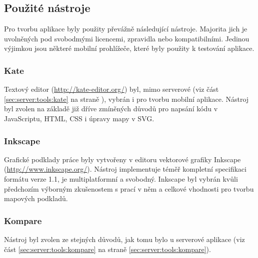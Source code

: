 \subsection{Použité nástroje}
Pro tvorbu aplikace byly použity převážně následující nástroje. Majorita jich je uvolněných pod svobodmými licencemi, zpravidla   nebo kompatibilními. Jedinou výjimkou jsou některé mobilní prohlížeče, které byly použity k testování aplikace.

\subsubsection{Kate}
Textový editor  (\url{http://kate-editor.org/}) byl, mimo serverové (viz část \ref{sec:server:tools:kate} na straně \pageref{sec:server:tools:kate}), vybrán i pro tvorbu mobilní aplikace. Nástroj byl zvolen na základě již dříve zmíněných důvodů pro napsání kódu v JavaScriptu, \gls{HTML}, \gls{CSS} i úpravy mapy v \gls{SVG}.

\subsubsection{Inkscape}
Grafické podklady práce byly vytvořeny v editoru vektorové grafiky Inkscape (\url{http://www.inkscape.org/}). Nástroj implementuje téměř kompletní specifikaci formátu  verze 1.1, je multiplatformní a svobodný. Inkscape byl vybrán kvůli předchozím výborným zkušenostem s prací v něm a celkové vhodnosti pro tvorbu mapových podkladů.

\subsubsection{Kompare}
Nástroj byl zvolen ze stejných důvodů, jak tomu bylo u serverové aplikace (viz část \ref{sec:server:tools:kompare} na straně \ref{sec:server:tools:kompare}).

